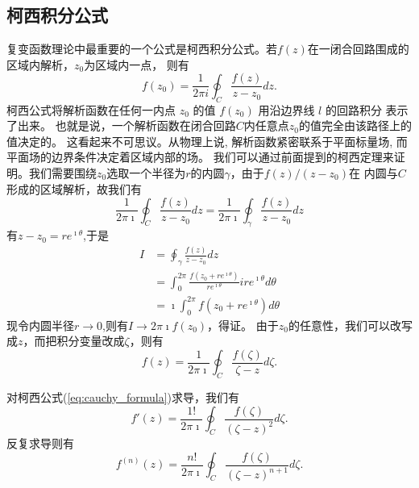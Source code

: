 \subsection{柯西积分公式}
\label{subsec:cauchy_formula}
复变函数理论中最重要的一个公式是柯西积分公式。若$f(z)$在一闭合回路围成的区域内解析，$z_0$为区域内一点，
则有
\begin{equation}
    f\left(z_0\right)=\frac{1}{2 \pi i} \oint_C \frac{f(z)}{z-z_0} d z .  
\end{equation}
柯西公式将解析函数在任何一内点 $z_0$ 的值 $f(z_0)$ 用沿边界线 $l$ 的回路积分 表示了出来。
也就是说，一个解析函数在闭合回路$C$内任意点$z_0$的值完全由该路径上的值决定的。 
这看起来不可思议。从物理上说, 解析函数紧密联系于平面标量场, 而平面场的边界条件决定着区域内部的场。
我们可以通过前面提到的柯西定理来证明。我们需要围绕$z_0$选取一个半径为$r$的内圆$\gamma$，由于$f(z)/(z-z_0)$在
内圆与$C$形成的区域解析，故我们有
\[ \frac{1}{2 \pi \imath} \oint_C \frac{f(z)}{z-z_0} d z = \frac{1}{2 \pi \imath} \oint_\gamma \frac{f(z)}{z-z_0} d z
    \]
有$z-z_0 = re^{\imath \theta}$,于是
\begin{equation}
    \begin{aligned}
        I &= \oint_\gamma \frac{f(z)}{z-z_0} d z
        \\
        & = \int _0 ^{2\pi} \frac{f(z_0 + re^{\imath \theta})}{re^{\imath \theta}} ire^{\imath \theta} d\theta
        \\
        & = \imath \int _0 ^{2\pi} f(z_0 + re^{\imath \theta}) d\theta
    \end{aligned}
\end{equation}
现令内圆半径$r\to 0$,则有$I\to 2\pi\imath f(z_0)$，得证。
由于$z_0$的任意性，我们可以改写成$z$，而把积分变量改成$\zeta$，则有
\begin{equation}
    f(z) = \frac{1}{2\pi \imath} \oint_C \frac{f(\zeta)}{\zeta - z} d \zeta.
    \label{eq:cauchy_formula}
\end{equation}

对柯西公式(\ref{eq:cauchy_formula})求导，我们有
\begin{equation}
    f'(z) = \frac{1!}{2\pi \imath} \oint_C \frac{f(\zeta)}{(\zeta - z)^2} d \zeta.
    \label{eq:cauchy_formula_1st_derivative}
\end{equation}
反复求导则有
\begin{equation}
    f^{(n)}(z) = \frac{n!}{2\pi \imath} \oint_C \frac{f(\zeta)}{(\zeta - z)^{n+1}} d \zeta.
    \label{eq:cauchy_formula_nth_derivative}
\end{equation}

